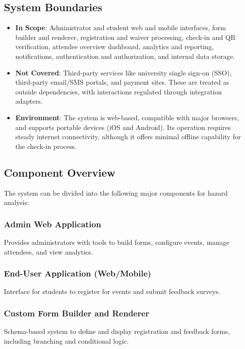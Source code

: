 \documentclass{article}
\begin{document}
\subsection{System Boundaries}

\begin{itemize}
    \item \textbf{In Scope}: Administrator and student web and mobile interfaces, 
    form builder and renderer, registration and waiver processing, check-in and QR verification, 
    attendee overview dashboard, analytics and reporting, notifications, authentication and authorization, 
    and internal data storage.
    
    \item \textbf{Not Covered}: Third-party services like university single sign-on (SSO), 
    third-party email/SMS portals, and payment sites. These are treated as outside dependencies, 
    with interactions regulated through integration adapters.
    
    \item \textbf{Environment}: The system is web-based, compatible with major browsers, 
    and supports portable devices (iOS and Android). Its operation requires steady internet connectivity, 
    although it offers minimal offline capability for the check-in process.
\end{itemize}

\subsection{Component Overview}

The system can be divided into the following major components for hazard analysis:

\subsubsection{Admin Web Application}
Provides administrators with tools to build forms, configure events, manage attendees, and view analytics.

\subsubsection{End-User Application (Web/Mobile)}
Interface for students to register for events and submit feedback surveys.

\subsubsection{Custom Form Builder and Renderer}
Schema-based system to define and display registration and feedback forms, including branching and conditional logic.
\end{document}
